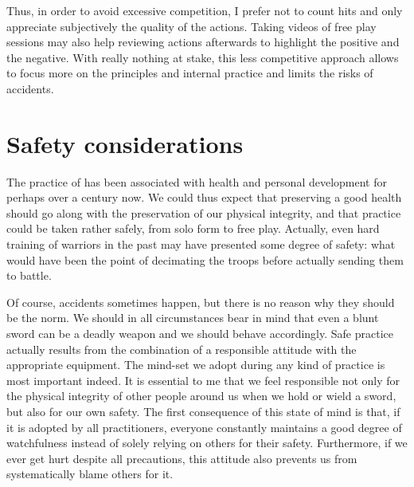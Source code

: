 Thus, in order to avoid excessive competition,  I prefer not to count hits and only appreciate subjectively the quality of the actions. Taking videos of free play sessions may also help reviewing actions afterwards to highlight the positive and the negative. 
With really nothing at stake, this less competitive approach allows to focus more on the principles and internal practice and limits the risks of accidents.



\section{Safety considerations}
The practice of \Taiji{} has been associated with health and personal development for perhaps over a century now. We could thus expect that preserving a good health should go along with the preservation of our physical integrity, and that \Taijijian{} practice could be taken rather safely, from solo form to free play.
Actually, even hard training of warriors in the past may have presented some degree of safety: what would have been the point of decimating the troops before actually sending them to battle. 

Of course, accidents sometimes happen, but there is no reason why they should be the norm. We should in all circumstances bear in mind that even a blunt sword can be a deadly weapon and we should behave accordingly. 
Safe practice actually results from the combination of a responsible attitude with the appropriate equipment. 
The mind-set we adopt during any kind of practice is most important indeed. It is essential to me that we feel responsible not only for the physical integrity of other people around us when we hold or wield a sword, but also for our own safety. 
The first consequence of this state of mind is that, if it is adopted by all practitioners, everyone constantly maintains a good degree of watchfulness instead of solely relying on others for their safety.
Furthermore, if we ever get hurt despite all precautions, this attitude also prevents us from systematically blame others for it.

